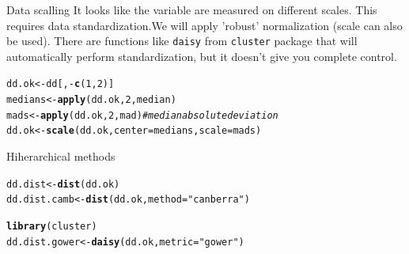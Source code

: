 \documentclass[10pt,xcolor=dvipsnames]{beamer}\usepackage[]{graphicx}\usepackage[]{color}
\makeatletter
\newcommand{\hlnum}[1]{\textcolor[rgb]{0.686,0.059,0.569}{#1}}%
\newcommand{\hlstr}[1]{\textcolor[rgb]{0.192,0.494,0.8}{#1}}%
\newcommand{\hlcom}[1]{\textcolor[rgb]{0.678,0.584,0.686}{\textit{#1}}}%
\newcommand{\hlopt}[1]{\textcolor[rgb]{0,0,0}{#1}}%
\newcommand{\hlstd}[1]{\textcolor[rgb]{0.345,0.345,0.345}{#1}}%
\newcommand{\hlkwb}[1]{\textcolor[rgb]{0.69,0.353,0.396}{#1}}%
\newcommand{\hlkwc}[1]{\textcolor[rgb]{0.333,0.667,0.333}{#1}}%
\newcommand{\hlkwd}[1]{\textcolor[rgb]{0.737,0.353,0.396}{\textbf{#1}}}%
\newenvironment{kframe}{%
 \def\at@end@of@kframe{}%
 \ifinner\ifhmode%
  \def\at@end@of@kframe{\end{minipage}}%
  \begin{minipage}{\columnwidth}%
 \fi\fi%
 \def\FrameCommand##1{\hskip\@totalleftmargin \hskip-\fboxsep
 \colorbox{shadecolor}{##1}\hskip-\fboxsep
     \hskip-\linewidth \hskip-\@totalleftmargin \hskip\columnwidth}%
 \MakeFramed {\advance\hsize-\width
   \@totalleftmargin\z@ \linewidth\hsize
   \@setminipage}}%
 {\par\unskip\endMakeFramed%
 \at@end@of@kframe}
\newenvironment{knitrout}{}{} %
\makeatother
\begin{document}
\begin{frame}{Data scalling}
It looks like the variable are measured on different scales. This requires data standardization.We will apply 'robust' normalization (scale can also be used). There are functions like
{\tt daisy} from {\tt cluster} package that will automatically perform standardization, but it doesn't give you complete control.

\begin{knitrout}\footnotesize
{}\color{fgcolor}\begin{kframe}
\begin{alltt}
\hlstd{dd.ok} \hlkwb{<-} \hlstd{dd[ ,} \hlopt{-}\hlkwd{c}\hlstd{(}\hlnum{1}\hlstd{,}\hlnum{2}\hlstd{)]}
\hlstd{medians} \hlkwb{<-} \hlkwd{apply}\hlstd{(dd.ok,} \hlnum{2}\hlstd{, median)}
\hlstd{mads} \hlkwb{<-} \hlkwd{apply}\hlstd{(dd.ok,} \hlnum{2}\hlstd{, mad)} \hlcom{# median absolute deviation}
\hlstd{dd.ok} \hlkwb{<-} \hlkwd{scale}\hlstd{(dd.ok,} \hlkwc{center}\hlstd{=medians,} \hlkwc{scale}\hlstd{=mads)}
\end{alltt}
\end{kframe}
\end{knitrout}
\end{frame}


\begin{frame}{Hiherarchical methods}

\begin{knitrout}\footnotesize
{}\color{fgcolor}\begin{kframe}
\begin{alltt}
\hlstd{dd.dist} \hlkwb{<-} \hlkwd{dist}\hlstd{(dd.ok)}
\hlstd{dd.dist.camb} \hlkwb{<-} \hlkwd{dist}\hlstd{(dd.ok,} \hlkwc{method}\hlstd{=}\hlstr{"canberra"}\hlstd{)}
\end{alltt}
\end{kframe}
\end{knitrout}

\begin{knitrout}\footnotesize
{}\color{fgcolor}\begin{kframe}
\begin{alltt}
\hlkwd{library}\hlstd{(cluster)}
\hlstd{dd.dist.gower} \hlkwb{<-} \hlkwd{daisy}\hlstd{(dd.ok,} \hlkwc{metric}\hlstd{=}\hlstr{"gower"}\hlstd{)}
\end{alltt}
\end{kframe}
\end{knitrout}

\end{frame}
\end{document}
